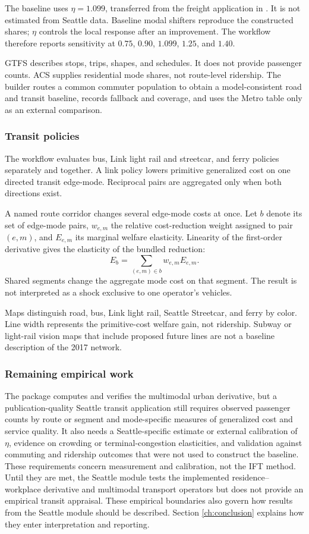 The baseline uses \(\eta=1.099\), transferred from the freight application in
\citet{FuchsWong2026Multimodal}. It is not estimated from Seattle data.
Baseline modal shifters reproduce the constructed shares; \(\eta\) controls the
local response after an improvement.
The workflow therefore reports sensitivity at \(0.75\), \(0.90\), \(1.099\),
\(1.25\), and \(1.40\).

GTFS describes stops, trips, shapes, and schedules. It does not provide
passenger counts. ACS supplies residential mode shares, not route-level
ridership. The builder routes a common commuter population to obtain a
model-consistent road and transit baseline, records fallback and coverage, and
uses the Metro table only as an external comparison.

\subsubsection{Transit policies}

The workflow evaluates bus, Link light rail and streetcar, and ferry policies
separately and together. A link policy lowers primitive generalized cost on
one directed transit edge-mode. Reciprocal pairs are aggregated only when both
directions exist.

A named route corridor changes several edge-mode costs at once. Let \(b\)
denote its set of edge-mode pairs, \(w_{e,m}\) the relative cost-reduction
weight assigned to pair \((e,m)\), and \(E_{e,m}\) its marginal welfare
elasticity. Linearity of the first-order derivative gives the elasticity of
the bundled reduction:
\[
 E_b=\sum_{(e,m)\in b}w_{e,m}E_{e,m}.
\]
Shared segments change the aggregate mode cost on that segment. The result is
not interpreted as a shock exclusive to one operator's vehicles.

Maps distinguish road, bus, Link light rail, Seattle Streetcar, and ferry by
color. Line width represents the primitive-cost welfare gain, not ridership.
Subway or light-rail vision maps that include proposed future lines are not a
baseline description of the 2017 network.

\subsubsection{Remaining empirical work}

The package computes and verifies the multimodal urban derivative, but a
publication-quality Seattle transit application still requires observed
passenger counts by route or segment and mode-specific measures of generalized
cost and service quality. It also needs a Seattle-specific estimate or external
calibration of \(\eta\), evidence on crowding or terminal-congestion
elasticities, and validation against commuting and ridership outcomes that were
not used to construct the baseline.
These requirements concern measurement and calibration, not the IFT method.
Until they are met, the Seattle module tests the implemented
residence--workplace derivative and multimodal transport operators but does
not provide an empirical transit appraisal. These empirical boundaries also
govern how results from the Seattle module should be described. Section
\ref{ch:conclusion} explains how they enter interpretation and reporting.
